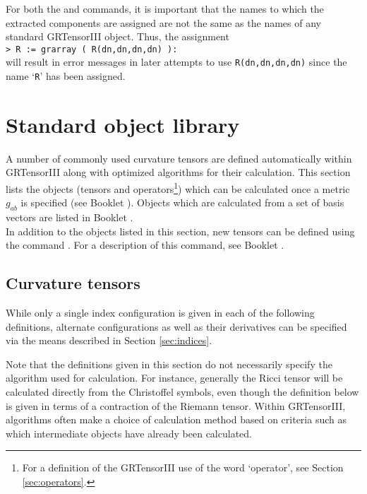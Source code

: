 \documentclass{article}
\begin{document}
{{{For both the  and  commands, it is important
that the names to which the extracted components are assigned are not the same
as the names of any standard GRTensorIII object. Thus, the assignment\\

\noindent\texttt{> R := grarray ( R(dn,dn,dn,dn) ):}\\

\noindent will result in error messages in later attempts to use
\texttt{R(dn,dn,dn,dn)} since the name `\texttt{R}' has been assigned.
%
\section{Standard object library} \label{sec:stdobj}
%
A number of commonly used curvature tensors are defined automatically within
GRTensorIII along with optimized algorithms for their calculation. This section
lists the objects (tensors and
operators\footnote{For a definition of the GRTensorIII use of the word
`operator', see Section \ref{sec:operators}.}) which can be calculated once a
metric $g_{ab}$ is specified (see Booklet \grMakegRef). Objects which are
calculated from a set of basis vectors are listed in Booklet \grBasisRef.\\

In addition to the objects listed in this section, new tensors can be
defined using the command . For a description of this command,
see Booklet \grDefRef.
%
\subsection{Curvature tensors}
%
While only a single index configuration is given in each of the following
definitions, alternate configurations as well as their derivatives can
be specified via the means described in Section \ref{sec:indices}.

Note that the definitions given in this section do not necessarily
specify the algorithm used for calculation. For instance, generally
the Ricci tensor will be calculated directly from the Christoffel
symbols, even though the definition below is given in terms of a
contraction of the Riemann tensor.  Within GRTensorIII, algorithms
often make a choice of calculation method based on criteria such
as which intermediate objects have already been calculated.\\

}}}
\end{document}
